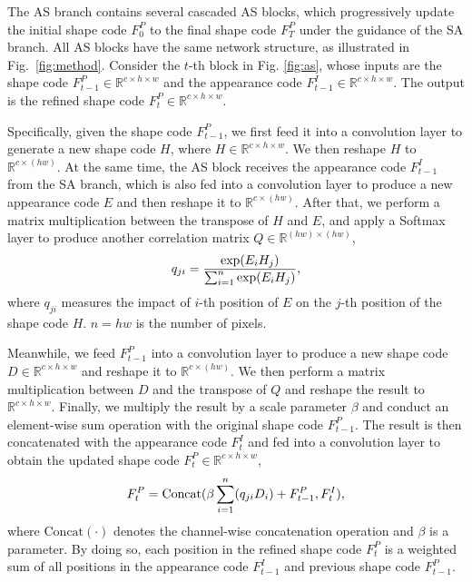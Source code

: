 \documentclass[runningheads]{llncs}
\begin{document}
The AS branch contains several cascaded AS blocks, which progressively update the initial shape code $F_0^P$ to the final shape code $F_T^P$ under the guidance of the SA branch. 
All AS blocks have the same network structure, as illustrated in Fig.~\ref{fig:method}.
Consider the $t$-th block in Fig. \ref{fig:as}, whose inputs are the shape code $F_{t-1}^P {\in} \mathbb{R}^{c \times h \times w}$ and the appearance code $F_{t-1}^I {\in} \mathbb{R}^{c \times h \times w}$. The output is the refined shape code $F_t^P {\in} \mathbb{R}^{c \times h \times w}$.

Specifically, given the shape code $F_{t-1}^P$, we first feed it into a convolution layer to generate a new shape code $H$, where $H {\in} \mathbb{R}^{c \times h \times w}$. 
We then reshape $H$ to $\mathbb{R}^{c \times (h w)}$.
At the same time, the AS block receives the appearance code $F_{t-1}^I$ from the SA branch, which is also fed into a convolution layer to produce a new appearance code $E$ and then reshape it to $\mathbb{R}^{c \times (h w)}$.
After that, we perform a matrix multiplication between the transpose of $H$ and $E$, and apply a Softmax layer to produce another correlation matrix $Q {\in} \mathbb{R}^{(h w) \times (h w)}$,
\begin{equation}
\begin{aligned}
q_{ji} = \frac{{\rm exp} (E_i  H_j)}{\sum_{i=1}^n {\rm exp}(E_i  H_j)},
\end{aligned}
\end{equation}
where $q_{ji}$ measures the impact of $i$-th position of $E$ on the $j$-th position of the shape code $H$. $n {=} h w$ is the number of pixels.

Meanwhile, we feed $F_{t-1}^P$ into a convolution layer to produce a new shape code $D {\in} \mathbb{R}^{c \times h \times w}$ and reshape it to $\mathbb{R}^{c \times (h  w)}$.
We then perform a matrix multiplication between $D$ and the transpose of $Q$ and reshape the result to $\mathbb{R}^{c \times h \times w}$.
Finally, we multiply the result by a scale parameter $\beta$ and conduct an element-wise sum operation with the original shape code $F_{t-1}^P$.
The result is then concatenated with the appearance code $F_t^I$ and fed into a convolution layer to obtain the updated shape code $F_t^P {\in} \mathbb{R}^{c \times h \times w}$,
\begin{equation}
\begin{aligned}
F_t^P = {\rm Concat}( \beta \sum_{i=1}^{n}(q_{ji} D_i) + F_{t-1}^P, F_t^I),
\end{aligned}
\end{equation}
where $\mathrm{Concat}(\cdot)$ denotes the channel-wise concatenation operation and $\beta$ is a parameter.
By doing so, each position in the refined shape code $F_t^P$ is a weighted sum of all positions in the appearance code $F_{t-1}^I$ and previous shape code $F_{t-1}^P$.
\end{document}
